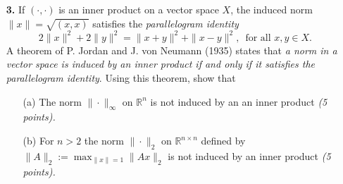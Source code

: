 \documentclass[10pt]{report}
\begin{document}
\begin{enumerate}
\item[\textbf{3.}] If $(\cdot,\cdot)$ is an inner product on a vector  space $X$, the induced norm $\|x\|= \sqrt{(x, x)}$ satisfies the \textit{parallelogram identity}
\[2 \|x\|^2 + 2\|y\|^2 = \|x+y\|^2 + \|x-y\|^2, \, \text{ for all } x,y \in X.\]
A theorem of P. Jordan and J. von Neumann (1935) states that \textit{a norm in a vector space is induced by an inner product if and only if it satisfies the parallelogram identity}. Using this theorem, show that
\begin{enumerate}
  \item[(a)] The norm $\|\cdot\|_{\infty}$ on $\mathbb{R}^n$ is not induced by an an inner product \textit{(5 points).}
  \item[(b)] For $n>2$ the norm $\|\cdot\|_{2}$ on $\mathbb{R}^{n\times n}$ defined by $\|A\|_2:= \max_{\|x\|=1}\|Ax\|_2$ is not induced by an inner product  \textit{(5 points).}
\end{enumerate}







\end{enumerate}
\end{document}
